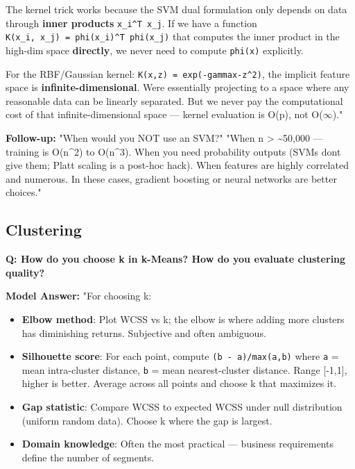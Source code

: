 \documentclass[11pt]{article}
\providecommand{\tightlist}{\setlength{\itemsep}{1pt}\setlength{\parskip}{0pt}}
\begin{document}
The kernel trick works because the SVM dual formulation only depends on data through \textbf{inner products} \texttt{x\_i\^{}T\ x\_j}. If we have a function \texttt{K(x\_i,\ x\_j)\ =\ phi(x\_i)\^{}T\ phi(x\_j)} that computes the inner product in the high-dim space \textbf{directly}, we never need to compute \texttt{phi(x)} explicitly.

For the RBF/Gaussian kernel: \texttt{K(x,z)\ =\ exp(-gamma\textbar{}\textbar{}x-z\textbar{}\textbar{}\^{}2)}, the implicit feature space is \textbf{infinite-dimensional}. We\textquotesingle re essentially projecting to a space where any reasonable data can be linearly separated. But we never pay the computational cost of that infinite-dimensional space --- kernel evaluation is O(p), not O(\(\infty\))."

\textbf{Follow-up:} "When would you NOT use an SVM?"
"When n \textgreater{} \textasciitilde50,000 --- training is O(n\^{}2) to O(n\^{}3). When you need probability outputs (SVMs don\textquotesingle t give them; Platt scaling is a post-hoc hack). When features are highly correlated and numerous. In these cases, gradient boosting or neural networks are better choices."

\subsection{Clustering}\label{clustering}

\textbf{Q: How do you choose k in k-Means? How do you evaluate clustering quality?}

\textbf{Model Answer:}
"For choosing k:

\begin{itemize}
\tightlist
\item
  \textbf{Elbow method}: Plot WCSS vs k; the \textquotesingle elbow\textquotesingle{} is where adding more clusters has diminishing returns. Subjective and often ambiguous.
\item
  \textbf{Silhouette score}: For each point, compute \texttt{(b\ -\ a)/max(a,b)} where \texttt{a} = mean intra-cluster distance, \texttt{b} = mean nearest-cluster distance. Range {[}-1,1{]}, higher is better. Average across all points and choose k that maximizes it.
\item
  \textbf{Gap statistic}: Compare WCSS to expected WCSS under null distribution (uniform random data). Choose k where the gap is largest.
\item
  \textbf{Domain knowledge}: Often the most practical --- business requirements define the number of segments.
\end{itemize}
\end{document}
